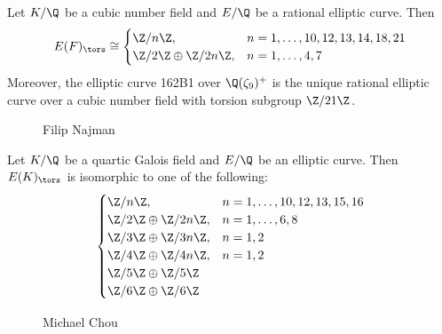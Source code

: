 \begin{frame}[plain]
\begin{thm}[Najman, 2012]
Let $K/\Q$ be a cubic number field and $E/\Q$ be a rational elliptic curve. Then
	\[
	E(F)_\tors \cong
	\begin{cases}
	\Z/n\Z, & n= 1,\ldots,10,12,13,14,18,21 \\
	\Z/2\Z \oplus \Z/2n\Z, & n= 1,\ldots,4,7
	\end{cases}
	\]
Moreover, the elliptic curve 162B1 over $\Q(\zeta_9)^+$ is the unique rational elliptic curve over a cubic number field with torsion subgroup $\Z/21\Z$.
\end{thm}
	\begin{figure}
	\captionsetup{labelformat=empty}
	\centering
	\caption{\hspace{0.1cm}Filip Najman}
	\end{figure}
\end{frame}


\begin{frame}[plain]
\begin{thm}[Chou, 2015]
Let $K/\Q$ be a quartic Galois field and $E/\Q$ be an elliptic curve. Then $E(K)_\tors$ is isomorphic to one of the following:
	\[
	\begin{cases}
	\Z/n\Z, & n= 1,\ldots,10,12,13,15,16 \\
	\Z/2\Z \oplus \Z/2n\Z, & n= 1,\ldots,6,8 \\
	\Z/3\Z \oplus \Z/3n\Z, & n= 1,2 \\
	\Z/4\Z \oplus \Z/4n\Z, & n= 1,2 \\
	\Z/5\Z \oplus \Z/5\Z \\
	\Z/6\Z \oplus \Z/6\Z
	\end{cases}
	\]
\end{thm}
	\begin{figure}
	\captionsetup{labelformat=empty}
	\centering
	\caption{Michael Chou}
	\end{figure}
\end{frame}


